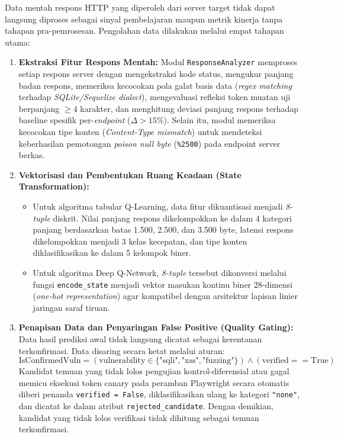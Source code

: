 Data mentah respons HTTP yang diperoleh dari server target tidak dapat langsung diproses sebagai sinyal pembelajaran maupun metrik kinerja tanpa tahapan pra-pemrosesan. Pengolahan data dilakukan melalui empat tahapan utama:
\begin{enumerate}
    \item \textbf{Ekstraksi Fitur Respons Mentah:} Modul \texttt{ResponseAnalyzer} memproses setiap respons server dengan mengekstraksi kode status, mengukur panjang badan respons, memeriksa kecocokan pola galat basis data (\textit{regex matching} terhadap \textit{SQLite/Sequelize dialect}), mengevaluasi refleksi token muatan uji berpanjang $\ge 4$ karakter, dan menghitung deviasi panjang respons terhadap baseline spesifik per-\textit{endpoint} ($\Delta > 15\%$). Selain itu, modul memeriksa kecocokan tipe konten (\textit{Content-Type mismatch}) untuk mendeteksi keberhasilan pemotongan \textit{poison null byte} (\texttt{\%2500}) pada endpoint server berkas.
    \item \textbf{Vektorisasi dan Pembentukan Ruang Keadaan (State Transformation):}
    \begin{itemize}
        \item Untuk algoritma tabular Q-Learning, data fitur dikuantisasi menjadi \textit{8-tuple} diskrit. Nilai panjang respons dikelompokkan ke dalam 4 kategori panjang berdasarkan batas 1.500, 2.500, dan 3.500 byte, latensi respons dikelompokkan menjadi 3 kelas kecepatan, dan tipe konten diklasifikasikan ke dalam 5 kelompok biner.
        \item Untuk algoritma Deep Q-Network, \textit{8-tuple} tersebut dikonversi melalui fungsi \texttt{encode\_state} menjadi vektor masukan kontinu biner 28-dimensi (\textit{one-hot representation}) agar kompatibel dengan arsitektur lapisan linier jaringan saraf tiruan.
    \end{itemize}
    \item \textbf{Penapisan Data dan Penyaringan False Positive (Quality Gating):}
    Data hasil prediksi awal tidak langsung dicatat sebagai kerentanan terkonfirmasi. Data disaring secara ketat melalui aturan:
    \begin{equation}
    \text{IsConfirmedVuln} = (\text{vulnerability} \in \{\text{"sqli"}, \text{"xss"}, \text{"fuzzing"}\}) \land (\text{verified} == \text{True})
    \end{equation}
    Kandidat temuan yang tidak lolos pengujian kontrol-diferensial atau gagal memicu eksekusi token canary pada peramban Playwright secara otomatis diberi penanda \texttt{verified = False}, diklasifikasikan ulang ke kategori \texttt{"none"}, dan dicatat ke dalam atribut \texttt{rejected\_candidate}. Dengan demikian, kandidat yang tidak lolos verifikasi tidak dihitung sebagai temuan terkonfirmasi.

\end{enumerate}
